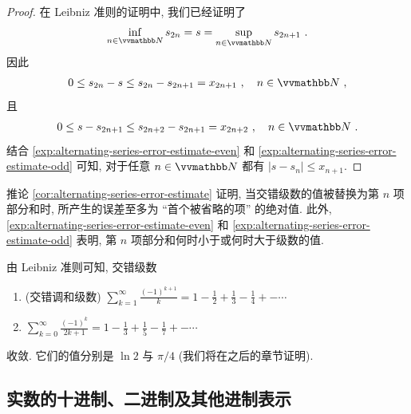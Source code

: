 \begin{proof}
    在 Leibniz 准则的证明中, 我们已经证明了
    \[
        \inf_{n \in \N} s_{2 n} = s = \sup_{n \in \N} s_{2 n + 1}\ .
    \]
    因此
    \begin{align}\label{exp:alternating-series-error-estimate-even}
        0 \leq s_{2 n} - s \leq s_{2 n} - s_{2 n + 1} = x_{2 n + 1}\ ,\quad n \in \N\ ,
    \end{align}
    且
    \begin{align}\label{exp:alternating-series-error-estimate-odd}
        0 \leq s - s_{2 n + 1} \leq s_{2 n + 2} - s_{2 n + 1} = x_{2 n + 2}\ ,\quad n \in \N\ .
    \end{align}
    结合 \eqref{exp:alternating-series-error-estimate-even} 和 \eqref{exp:alternating-series-error-estimate-odd} 可知, 对于任意 \(n \in \N\) 都有 \(|s - s_n| \leq x_{n + 1}\).
\end{proof}

推论 \ref{cor:alternating-series-error-estimate} 证明, 当交错级数的值被替换为第 \(n\) 项部分和时, 所产生的误差至多为 ``首个被省略的项'' 的绝对值. 此外, \eqref{exp:alternating-series-error-estimate-even} 和 \eqref{exp:alternating-series-error-estimate-odd} 表明, 第 \(n\) 项部分和何时小于或何时大于级数的值.

\begin{example}\label{eg:alternating-harmonic-series}
    由 Leibniz 准则可知, 交错级数
    \begin{enumerate}
        \item (交错调和级数) \(\displaystyle \sum_{k = 1}^\infty \frac{(- 1)^{k + 1}}{k} = 1 - \frac{1}{2} + \frac{1}{3} - \frac{1}{4} + - \cdots\)
        \item \(\displaystyle \sum_{k = 0}^\infty \frac{(- 1)^k}{2 k + 1} = 1 - \frac{1}{3} + \frac{1}{5} - \frac{1}{7} + - \cdots\)
    \end{enumerate}
    收敛. 它们的值分别是 \(\ln 2\) 与 \(\pi / 4\) (我们将在之后的章节证明).
\end{example}

\subsection{实数的十进制、二进制及其他进制表示}

